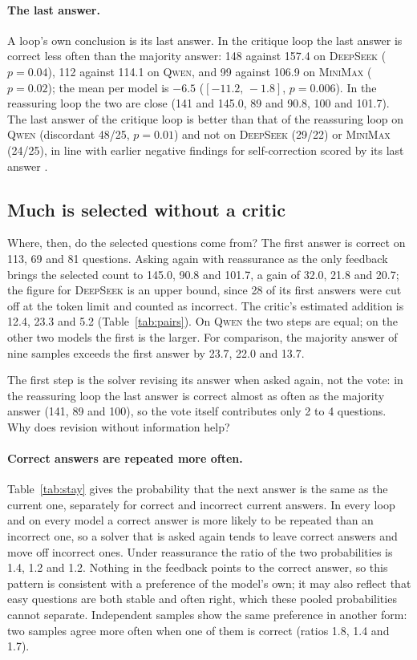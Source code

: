 \documentclass[11pt]{article}
\newcommand{\ds}{\textsc{DeepSeek}}
\newcommand{\qw}{\textsc{Qwen}}
\newcommand{\mm}{\textsc{MiniMax}}
\newcommand{\ci}[2]{$[#1,\,#2]$}
\begin{document}
\paragraph{The last answer.}
A loop's own conclusion is its last answer.
In the critique loop the last answer is correct less often than the majority answer: 148 against 157.4 on \ds{} ($p=0.04$), 112 against 114.1 on \qw, and 99 against 106.9 on \mm{} ($p=0.02$); the mean per model is $-6.5$ (\ci{-11.2}{-1.8}, $p=0.006$).
In the reassuring loop the two are close (141 and 145.0, 89 and 90.8, 100 and 101.7).
The last answer of the critique loop is better than that of the reassuring loop on \qw{} (discordant 48/25, $p=0.01$) and not on \ds{} (29/22) or \mm{} (24/25), in line with earlier negative findings for self-correction scored by its last answer \citep{huang2024cannot}.

\subsection{Much is selected without a critic}
\label{sec:mech}

Where, then, do the selected questions come from?
The first answer is correct on 113, 69 and 81 questions.
Asking again with reassurance as the only feedback brings the selected count to 145.0, 90.8 and 101.7, a gain of 32.0, 21.8 and 20.7; the figure for \ds{} is an upper bound, since 28 of its first answers were cut off at the token limit and counted as incorrect.
The critic's estimated addition is 12.4, 23.3 and 5.2 (Table~\ref{tab:pairs}).
On \qw{} the two steps are equal; on the other two models the first is the larger.
For comparison, the majority answer of nine samples exceeds the first answer by 23.7, 22.0 and 13.7.

The first step is the solver revising its answer when asked again, not the vote: in the reassuring loop the last answer is correct almost as often as the majority answer (141, 89 and 100), so the vote itself contributes only 2 to 4 questions.
Why does revision without information help?

\paragraph{Correct answers are repeated more often.}
Table~\ref{tab:stay} gives the probability that the next answer is the same as the current one, separately for correct and incorrect current answers.
In every loop and on every model a correct answer is more likely to be repeated than an incorrect one, so a solver that is asked again tends to leave correct answers and move off incorrect ones.
Under reassurance the ratio of the two probabilities is 1.4, 1.2 and 1.2.
Nothing in the feedback points to the correct answer, so this pattern is consistent with a preference of the model's own; it may also reflect that easy questions are both stable and often right, which these pooled probabilities cannot separate.
Independent samples show the same preference in another form: two samples agree more often when one of them is correct (ratios 1.8, 1.4 and 1.7).
\end{document}
